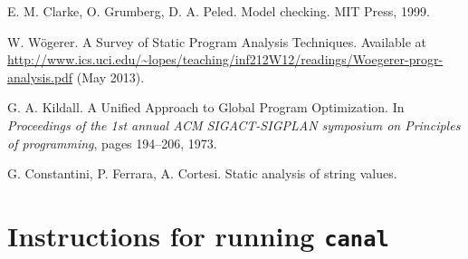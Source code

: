 \documentclass[12pt,final,oneside]{fithesis2}
\begin{document}
\begin{thebibliography}{99}
E{.} M{.} Clarke, O{.} Grumberg, D{.} A{.} Peled.
\newblock Model checking.
\newblock MIT Press, 1999.

W{.} W\"{o}gerer.
\newblock A Survey of Static Program Analysis Techniques.
\newblock Available at \url{http://www.ics.uci.edu/~lopes/teaching/inf212W12/readings/Woegerer-progr-analysis.pdf}
  (May 2013).

G{.} A{.} Kildall.
\newblock A Unified Approach to Global Program Optimization.
\newblock In \emph{Proceedings of the 1st annual ACM SIGACT-SIGPLAN
  symposium on Principles of programming}, pages 194--206, 1973.

G{.} Constantini, P{.} Ferrara, A{.} Cortesi.
\newblock Static analysis of string values.

\end{thebibliography}


\appendix

\chapter{Instructions for running \texttt{canal}}
\label{chap:instructions}

\end{document}
